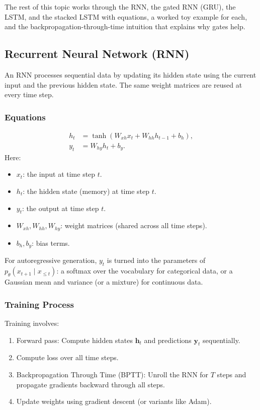 \documentclass[11pt]{article}
\theoremstyle{remark}
\begin{document}
The rest of this topic works through the RNN, the gated RNN (GRU), the LSTM, and the stacked LSTM with equations, a worked toy example for each, and the backpropagation-through-time intuition that explains why gates help.

\subsection{Recurrent Neural Network (RNN)}

An RNN processes sequential data by updating its hidden state using the current input and the previous hidden state. The same weight matrices are reused at every time step.

\subsubsection*{Equations}
\begin{align}
    h_t &= \tanh(W_{xh} x_t + W_{hh} h_{t-1} + b_h), \\
    y_t &= W_{hy} h_t + b_y.
\end{align}
Here:
\begin{itemize}
    \item $x_t$: the input at time step $t$.
    \item $h_t$: the hidden state (memory) at time step $t$.
    \item $y_t$: the output at time step $t$.
    \item $W_{xh}, W_{hh}, W_{hy}$: weight matrices (shared across all time steps).
    \item $b_h, b_y$: bias terms.
\end{itemize}
For autoregressive generation, $y_t$ is turned into the parameters of $p_\theta(x_{t+1} \mid x_{\le t})$: a softmax over the vocabulary for categorical data, or a Gaussian mean and variance (or a mixture) for continuous data.

\subsubsection*{Training Process}
Training involves:
\begin{enumerate}[label=\roman*)]
    \item Forward pass: Compute hidden states $\mathbf{h}_t$ and predictions $\mathbf{y}_t$ sequentially.
    \item Compute loss over all time steps.
    \item Backpropagation Through Time (BPTT): Unroll the RNN for $T$ steps and propagate gradients backward through all steps.
    \item Update weights using gradient descent (or variants like Adam).
\end{enumerate}
\end{document}
